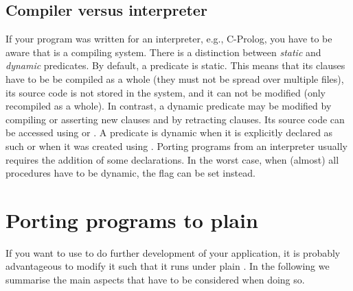 \subsection{Compiler versus interpreter}
If your program was written for an interpreter, e.g., C-Prolog,
you have to be aware that {\eclipse} is a compiling system.
There is a distinction between \emph{static} and \emph{dynamic} predicates.
By default, a predicate is static. This means that its clauses have to be
be compiled as a whole (they must not be spread over multiple files),
its source code is not stored in the system,
and it can not be modified (only recompiled as a whole).
In contrast, a dynamic predicate may be modified by compiling or
asserting new clauses and by retracting clauses.
Its source code can be accessed using
%
or
.%
A predicate is dynamic when it is explicitly declared as such or when
it was created using .
Porting programs from an interpreter usually requires the addition of
some  declarations.
In the worst case, when (almost) all procedures have to be dynamic,
the flag  can be set instead.


\section{Porting programs to plain {\eclipse}}
If you want to use {\eclipse} to do further development of your application,
it is probably advantageous to modify it such that it runs under plain
{\eclipse}.
In the following we summarise the main aspects that have to be considered
when doing so.

